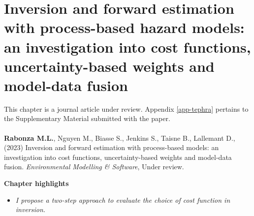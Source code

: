 \setcounter{chapter}{1}
\chapter[Inversion and forward estimation with process-based hazard models: an investigation into cost functions, uncertainty-based weights and model-data fusion]{Inversion and forward estimation with process-based hazard models: an investigation into cost functions, uncertainty-based weights and model-data fusion}\label{chap-tephra}

\begin{small}
This chapter is a journal article under review. Appendix \ref{app-tephra} pertains to the Supplementary Material submitted with the paper.
\\
\\
\noindent
\textbf{Rabonza M.L.}, Nguyen M., Biasse S., Jenkins S., Taisne B., Lallemant D., (2023) Inversion and forward estimation with process-based models: an investigation into cost functions, uncertainty-based weights and model-data fusion. \textit{Environmental Modelling & Software}, Under review.





\clearpage
\vspace*{\fill}
\begingroup
\centering

\textbf{\Large{Chapter highlights}}

\hrulefill 

\begin{itemize}
\item \textsl{I propose a two-step approach to evaluate the choice of cost function in inversion.}


\end{itemize}
\end{small}
